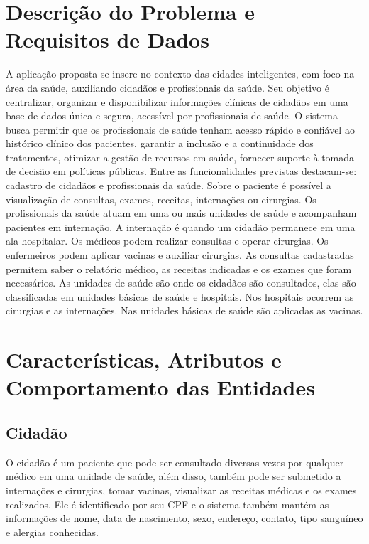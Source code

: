\documentclass[12pt, a4paper]{article}
\begin{document}
\tableofcontents
\newpage

\onehalfspacing 


\section{Descrição do Problema e Requisitos de Dados}

A aplicação proposta se insere no contexto das cidades inteligentes, com foco na
área da saúde, auxiliando cidadãos e profissionais da saúde. Seu objetivo é centralizar,
organizar e disponibilizar informações clínicas de cidadãos em uma base de dados única
e segura, acessível por profissionais de saúde.
O sistema busca permitir que os profissionais de saúde tenham acesso rápido e
confiável ao histórico clínico dos pacientes, garantir a inclusão e a continuidade dos
tratamentos, otimizar a gestão de recursos em saúde, fornecer suporte à tomada de
decisão em políticas públicas. Entre as funcionalidades previstas destacam-se: cadastro
de cidadãos e profissionais da saúde. Sobre o paciente é possível a visualização de
consultas, exames, receitas, internações ou cirurgias. Os profissionais da saúde atuam
em uma ou mais unidades de saúde e acompanham pacientes em internação. A
internação é quando um cidadão permanece em uma ala hospitalar. Os médicos podem
realizar consultas e operar cirurgias. Os enfermeiros podem aplicar vacinas e auxiliar
cirurgias. As consultas cadastradas permitem saber o relatório médico, as receitas
indicadas e os exames que foram necessários. As unidades de saúde são onde os
cidadãos são consultados, elas são classificadas em unidades básicas de saúde e
hospitais. Nos hospitais ocorrem as cirurgias e as internações. Nas unidades básicas de
saúde são aplicadas as vacinas.

\section{Características, Atributos e Comportamento das Entidades}

\subsection*{Cidadão}
    O cidadão é um paciente que pode ser consultado diversas vezes 
    por qualquer médico em uma unidade de saúde, além disso, também 
    pode ser submetido a internações e cirurgias, tomar vacinas, 
    visualizar as receitas médicas e os exames realizados. 
    Ele é identificado por seu CPF e o sistema também mantém as 
    informações de nome, data de nascimento, sexo, endereço, contato, 
    tipo sanguíneo e alergias conhecidas.
\end{document}
